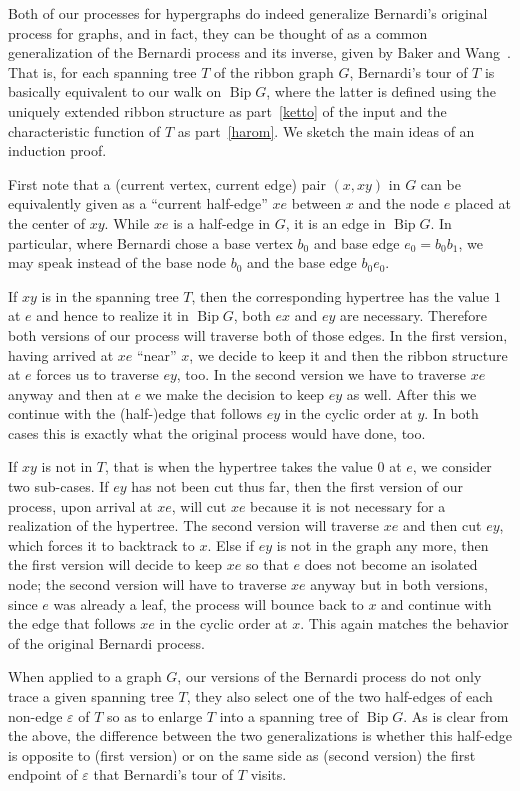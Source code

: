 \documentclass[ALCO,ThmDefs,Unicode,epreuves]{cedram}
\DeclareMathOperator{\bip}{Bip}
\begin{document}
\begin{rema}
\label{rem:altalanosit}
Both of our processes for hypergraphs do indeed generalize Bernardi's original process for graphs, and in fact, they can be thought of as a common generalization of the Bernardi process and its inverse, given by Baker and Wang~\cite{Baker-Wang}. That is, for each spanning tree $T$ of the ribbon graph $G$, Bernardi's tour of $T$ is basically equivalent to our walk on $\bip G$, where the latter is defined using the uniquely extended ribbon structure as part~\ref{ketto} of the input and the characteristic function of $T$ as part~\ref{harom}. We sketch the main ideas of an induction proof. 

First note that a (current vertex, current edge) pair $(x,xy)$ in $G$ can be equivalently given as a ``current half-edge'' $xe$ between $x$ and the node $e$ placed at the center of $xy$. While $xe$ is a half-edge in $G$, it is an edge in $\bip G$. In particular, where Bernardi chose a base vertex $b_0$ and base edge $e_0=b_0b_1$, we may speak instead of the base node $b_0$ and the base edge $b_0e_0$.

If $xy$ is in the spanning tree $T$, then the corresponding hypertree has the value $1$ at $e$ and hence to realize it in $\bip G$, both $ex$ and $ey$ are necessary. Therefore both versions of our process will traverse both of those edges. In the first version, having arrived at $xe$ ``near'' $x$, we decide to keep it and then the ribbon structure at $e$ forces us to traverse $ey$, too. In the second version we have to traverse $xe$ anyway and then at $e$ we make the decision to keep $ey$ as well. After this we continue with the (half-)edge that follows $ey$ in the cyclic order at $y$. In both cases this is exactly what the original process would have done, too. 

If $xy$ is not in $T$, that is when the hypertree takes the value $0$ at $e$, we consider two sub-cases. If $ey$ has not been cut thus far, then the first version of our process, upon arrival at $xe$, will cut $xe$ because it is not necessary for a realization of the hypertree. The second version will traverse $xe$ and then cut $ey$, which forces it to backtrack to $x$. Else if $ey$ is not in the graph any more, then the first version will decide to keep $xe$ so that $e$ does not become an isolated node; the second version will have to traverse $xe$ anyway but in both versions, since $e$ was already a leaf, the process will bounce back to $x$ and continue with the edge that follows $xe$ in the cyclic order at $x$. This again matches the behavior of the original Bernardi process.

When applied to a graph $G$, our versions of the Bernardi process do not only trace a given spanning tree $T$, they also select one of the two half-edges of each non-edge $\varepsilon$ of $T$ so as to enlarge $T$ into a spanning tree of $\bip G$. As is clear from the above, the difference between the two generalizations is whether this half-edge is opposite to (first version) or on the same side as (second version) the first endpoint of $\varepsilon$ that Bernardi's tour of $T$ visits.
\end{rema}
\end{document}
